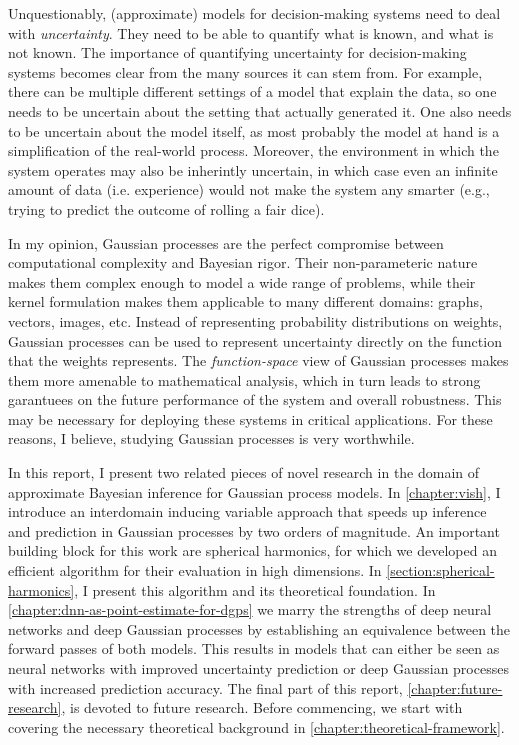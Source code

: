 Unquestionably, (approximate) models for decision-making systems need to deal with \emph{uncertainty}. They need to be able to quantify what is known, and what is not known. The importance of quantifying uncertainty for decision-making systems becomes clear from the many sources it can stem from. For example, there can be multiple different settings of a model that explain the data, so one needs to be uncertain about the setting that actually generated it. One also needs to be uncertain about the model itself, as most probably the model at hand is a simplification of the real-world process. Moreover, the environment in which the system operates may also be inherintly uncertain, in which case even an infinite amount of data (i.e. experience) would not make the system any smarter (e.g., trying to predict the outcome of rolling a fair dice).

In my opinion, Gaussian processes are the perfect compromise between computational complexity and Bayesian rigor. Their non-parameteric nature makes them complex enough to model a wide range of problems, while their kernel formulation makes them applicable to many different domains: graphs, vectors, images, etc. Instead of representing probability distributions on weights, Gaussian processes can be used to represent uncertainty directly on the function that the weights represents. The \emph{function-space} view of Gaussian processes makes them more amenable to mathematical analysis, which in turn leads to strong garantuees on the future performance of the system and overall robustness. This may be necessary for deploying these systems in critical applications. For these reasons, I believe, studying Gaussian processes is very worthwhile.

In this report, I present two related pieces of novel research in the domain of approximate Bayesian inference for Gaussian process models. In \cref{chapter:vish}, I introduce an interdomain inducing variable approach that speeds up inference and prediction in Gaussian processes by two orders of magnitude. An important building block for this work are spherical harmonics, for which we developed an efficient algorithm for their evaluation in high dimensions. In \cref{section:spherical-harmonics}, I present this algorithm and its theoretical foundation. In \cref{chapter:dnn-as-point-estimate-for-dgps} we marry the strengths of deep neural networks and deep Gaussian processes by establishing an equivalence between the forward passes of both models. This results in models that can either be seen as neural networks with improved uncertainty prediction or deep Gaussian processes with increased prediction accuracy. The final part of this report, \cref{chapter:future-research}, is devoted to future research. Before commencing, we start with covering the necessary theoretical background in \cref{chapter:theoretical-framework}.

